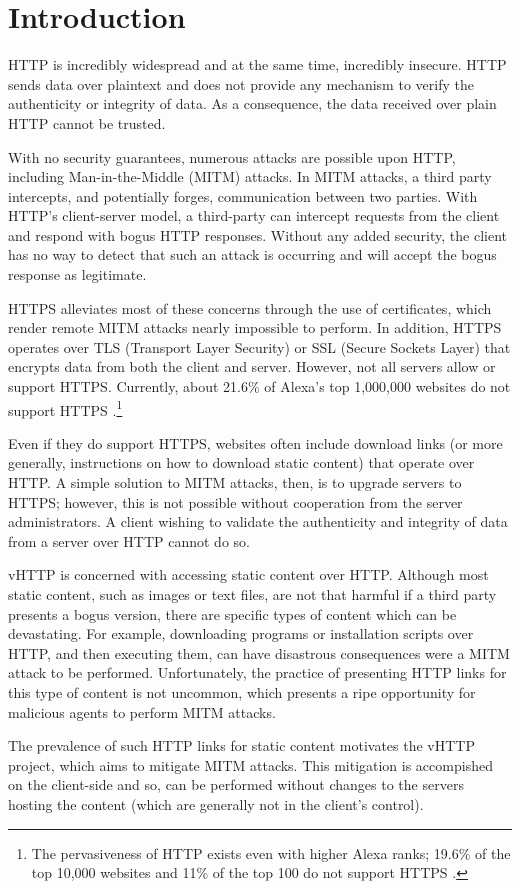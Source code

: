 \section{Introduction}
\label{sec:intro}

HTTP is incredibly widespread and at the same time, incredibly insecure. HTTP
sends data over plaintext and does not provide any mechanism to verify the
authenticity or integrity of data. As a consequence, the data received over
plain HTTP cannot be trusted.

With no security guarantees, numerous attacks are possible upon HTTP, including
Man-in-the-Middle (MITM) attacks. In MITM attacks, a third party intercepts,
and potentially forges, communication between two parties. With HTTP's
client-server model, a third-party can intercept requests from the client and
respond with bogus HTTP responses. Without any added security, the client has
no way to detect that such an attack is occurring and will accept the bogus
response as legitimate.

HTTPS alleviates most of these concerns through the use of certificates, which
render remote MITM attacks nearly impossible to perform. In addition, HTTPS
operates over TLS (Transport Layer Security) or SSL (Secure Sockets Layer) that
encrypts data from both the client and server. However, not all servers allow
or support HTTPS. Currently, about 21.6\% of Alexa's top 1,000,000 websites do
not support HTTPS \cite{Censys-HTTPS}.\footnote{
  The pervasiveness of HTTP exists even with higher Alexa ranks; 19.6\% of the
  top 10,000 websites and 11\% of the top 100 do not support HTTPS
  \cite{Censys-HTTPS}.
  }

Even if they do support HTTPS, websites often include
download links (or more generally, instructions on how to download static
content) that operate over HTTP. A simple solution to MITM attacks, then, is
to upgrade servers to HTTPS; however, this is not possible without cooperation
from the server administrators. A client wishing to validate the authenticity
and integrity of data from a server over HTTP cannot do so.

vHTTP is concerned with accessing static content over HTTP. Although most
static content, such as images or text files, are not that harmful if a third
party presents a bogus version, there are specific types of content
which can be devastating. For example, downloading programs or installation
scripts over HTTP, and then executing them, can have disastrous consequences
were a MITM attack to be performed. Unfortunately, the practice of presenting
HTTP links for this type of content is not uncommon, which presents a ripe
opportunity for malicious agents to perform MITM attacks.

The prevalence of such HTTP links for static content motivates the vHTTP
project, which aims to mitigate MITM attacks. This mitigation is accompished on
the client-side and so, can be performed without changes to the servers hosting
the content (which are generally not in the client's control).
